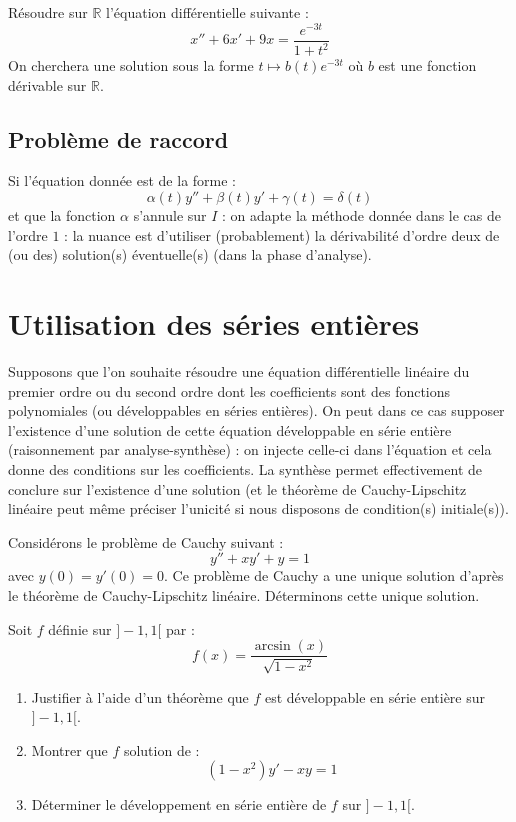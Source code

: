 \documentclass[french,11pt,twoside]{VcCours}
\begin{document}
\begin{Exemple} Résoudre sur $\mathbb{R}$ l'équation différentielle suivante :
$$ x''+6x'+9x= \dfrac{e^{-3t}}{1+t^2}$$
On cherchera une solution sous la forme $t \mapsto b(t)e^{-3t}$ où $b$ est une fonction dérivable sur $\mathbb{R}$.

\vspace*{11cm}
\end{Exemple}


\subsection{Problème de raccord}
Si l'équation donnée est de la forme :
$$ \alpha(t) y''+ \beta(t) y'+ \gamma(t) = \delta(t)$$
et que la fonction $\alpha$ s'annule sur $I$ : on adapte la méthode donnée dans le cas de l'ordre $1$ : la nuance est d'utiliser (probablement) la dérivabilité d'ordre deux de (ou des) solution(s) éventuelle(s) (dans la phase d'analyse).
\section{Utilisation des séries entières}
Supposons que l'on souhaite résoudre une équation différentielle linéaire du premier ordre ou du second ordre dont les coefficients sont des fonctions polynomiales (ou développables en séries entières). On peut dans ce cas supposer l'existence d'une solution de cette équation développable en série entière (raisonnement par analyse-synthèse) : on injecte celle-ci dans l'équation et cela donne des conditions sur les coefficients. La synthèse permet effectivement de conclure sur l'existence d'une solution (et le théorème de Cauchy-Lipschitz linéaire peut même préciser l'unicité si nous disposons de condition(s) initiale(s)).



\begin{Exemple} Considérons le problème de Cauchy suivant :
$$ y''+xy'+y=1 $$
avec $y(0)=y'(0)=0$. Ce problème de Cauchy a une unique solution d'après le théorème de Cauchy-Lipschitz linéaire. Déterminons cette unique solution.

\vspace*{10cm}
\end{Exemple}

\newpage


\begin{ApplicationDirecte}{}
Soit $f$ définie sur $]-1,1[$ par :
$$ f(x) = \dfrac{\arcsin(x)}{\sqrt{1-x^2}}$$
\begin{enumerate}
\item Justifier à l'aide d'un théorème que $f$ est développable en série entière sur $]-1,1[$.
\item Montrer que $f$ solution de :
$$ (1-x^2)y'-xy=1$$
\item Déterminer le développement en série entière de $f$ sur $]-1,1[$.
\end{enumerate}
\end{ApplicationDirecte}
\end{document}
